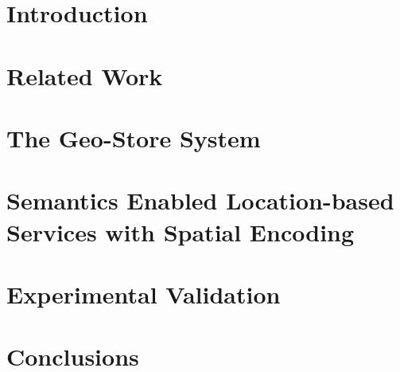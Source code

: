 
%

\section{Introduction}\label{sec-intro}


\section{Related Work}\label{sec-relwork}


\section{The Geo-Store System}\label{sec-design}


\section{Semantics Enabled Location-based Services with Spatial Encoding}\label{sec-query}


\section{Experimental Validation}\label{sec-experiment}


\section{Conclusions}\label{sec-conc}

